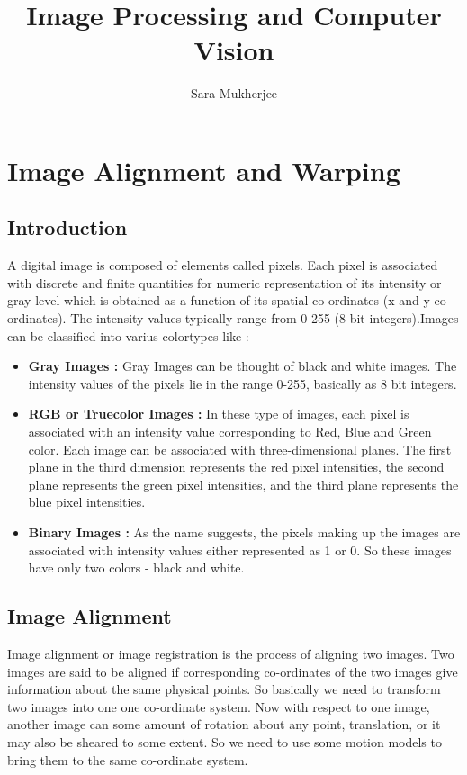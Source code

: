 \documentclass{report}
\title{Image Processing and Computer Vision}
\author{Sara Mukherjee}
\begin{document}
\maketitle
\tableofcontents
\chapter{Image Alignment and Warping}
\section{Introduction}
A digital image is composed of elements called pixels. Each pixel is associated with discrete and finite quantities for numeric representation of its intensity or gray level which is obtained as a function of its spatial co-ordinates (x and y co-ordinates). The intensity values typically range from 0-255 (8 bit integers).Images can be classified into varius colortypes like :
\begin{itemize}
    \item \textbf{Gray Images :} Gray Images can be thought of black and white images. The intensity values of the pixels lie in the range 0-255, basically as 8 bit integers.
    \item \textbf{RGB or Truecolor Images :} In these type of images, each pixel is associated with an intensity value corresponding to Red, Blue and Green color. Each image can be associated with three-dimensional planes. The first plane in the third dimension represents the red pixel intensities, the second plane represents the green pixel intensities, and the third plane represents the blue pixel intensities.
    \item \textbf{Binary Images : } As the name suggests, the pixels making up the images are associated with intensity values either represented as 1 or 0. So these images have only two colors - black and white.
\end{itemize}
\section{Image Alignment}
Image alignment or image registration is the process of aligning two images. Two images are said to be aligned if corresponding co-ordinates of the two images give information about the same physical points. So basically we need to transform two images into one one co-ordinate system. Now with respect to one image, another image can some amount of rotation about any point, translation, or it may also be sheared to some extent. So we need to use some motion models to bring them to the same co-ordinate system.
\end{document}
